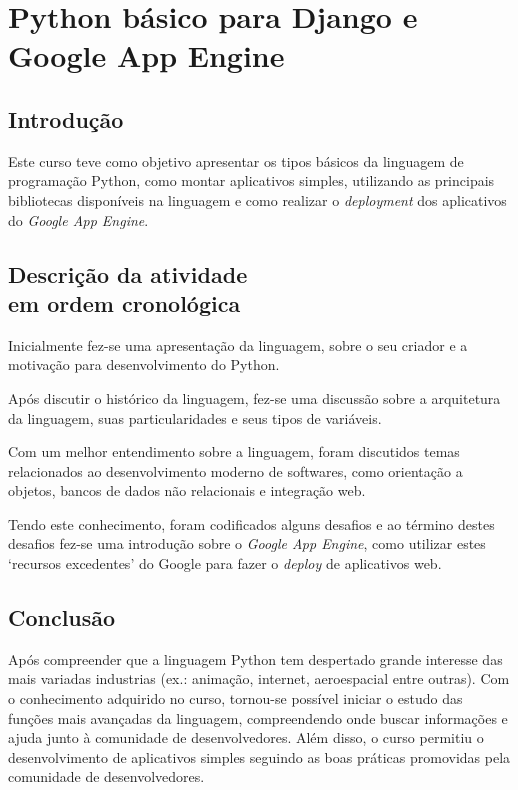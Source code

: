 \documentclass[a4paper]{report}
\begin{document}
    \chapter[Python básico]{Python básico para Django e Google App Engine}

        \section{Introdução}
        Este curso teve como objetivo apresentar os tipos básicos da linguagem
        de programação Python, como montar aplicativos simples, utilizando as
        principais bibliotecas disponíveis na linguagem e como realizar o
        \emph{deployment} dos aplicativos do \emph{Google App Engine}.

        \section[Descrição atividade]{Descrição da atividade
        \\em ordem cronológica}
        Inicialmente fez-se uma apresentação da linguagem, sobre o seu criador
        e a motivação para desenvolvimento do Python.

        Após discutir o histórico da linguagem, fez-se uma discussão sobre a
        arquitetura da linguagem, suas particularidades e seus tipos de
        variáveis.

        Com um melhor entendimento sobre a linguagem, foram discutidos temas
        relacionados ao desenvolvimento moderno de softwares, como orientação a
        objetos, bancos de dados não relacionais e integração web.

        Tendo este conhecimento, foram codificados alguns desafios e ao término
        destes desafios fez-se uma introdução sobre o \emph{Google App Engine},
        como utilizar estes `recursos excedentes' do Google para fazer o
        \emph{deploy} de aplicativos web.

        \section{Conclusão}
        Após compreender que a linguagem Python tem despertado grande interesse
        das mais variadas industrias (ex.: animação, internet, aeroespacial
        entre outras). Com o conhecimento adquirido no curso, tornou-se possível
        iniciar o estudo das funções mais avançadas da linguagem, compreendendo
        onde buscar informações e ajuda junto à comunidade de desenvolvedores.
        Além disso, o curso permitiu o desenvolvimento de aplicativos simples
        seguindo as boas práticas promovidas pela comunidade de desenvolvedores.
\end{document}
